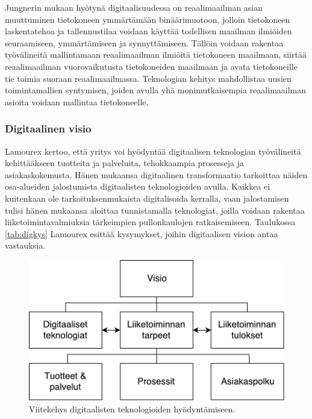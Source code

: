 \documentclass[finnish,12pt,a4paper,pdftex]{article}
\begin{document}
Jungnerin \citeyearpar{jungner} mukaan hyötynä digitaalisuudessa on reaalimaailman asian muuttuminen tietokoneen ymmärtämään binäärimuotoon, jolloin tietokoneen laskentatehoa ja tallennustilaa voidaan käyttää todellisen maailman ilmiöiden seuraamiseen, ymmärtämiseen ja synnyttämiseen. Tällöin voidaan rakentaa työvälineitä mallintamaan reaalimaailman ilmiöitä tietokoneen maailmaan, siirtää reaalimaailman vuorovaikutusta tietokoneiden maailmaan ja avata tietokoneille tie toimia suoraan reaalimaailmassa. Teknologian kehitys mahdollistaa uusien toimintamallien syntymisen, joiden avulla yhä monimutkaisempia reaalimaailman asioita voidaan mallintaa tietokoneelle.

\subsubsection{Digitaalinen visio}

Lamourex \citeyearpar{lamoureux} kertoo, että yritys voi hyödyntää digitaalisen teknologian työvälineitä kehittääkseen tuotteita ja palveluita, tehokkaampia prosesseja ja asiakaskokemusta. Hänen mukaansa digitaalinen transformaatio tarkoittaa näiden osa-alueiden jalostumista digitaalisten teknologioiden avulla. Kaikkea ei kuitenkaan ole tarkoituksenmukaista digitalisoida kerralla, vaan jalostamisen tulisi hänen mukaansa aloittaa tunnistamalla teknologiat, joilla voidaan rakentaa liiketoimintavalmiuksia tärkeimpien pullonkaulojen ratkaisemiseen. Taulukossa \ref{tab:digkys} Lamourex esittää kysymykset, joihin digitaalisen vision antaa vastauksia.

\begin{figure}[!h]
    \centering
    \includegraphics[scale=0.6]{images/digitaalinenvisio.pdf}
    \caption{Viitekehys digitaalisten teknologioiden hyödyntämiseen. \citep{lamoureux}}
    \label{fig:digivisio}
\end{figure}
\end{document}
